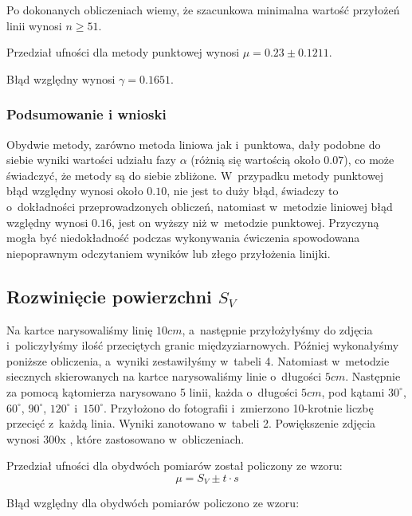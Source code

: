 \documentclass[a4paper,12pt]{article}
\begin{document}
Po dokonanych obliczeniach wiemy, że szacunkowa minimalna wartość przyłożeń linii wynosi $n\ge 51$.



Przedział ufności dla metody punktowej wynosi $\mu=0.23\pm 0.1211$.

Błąd względny wynosi $\gamma=0.1651$.
\newpage

{\color{purple}
\subsubsection{Podsumowanie i wnioski}



Obydwie metody, zarówno metoda liniowa jak i~punktowa, dały podobne  do siebie wyniki wartości udziału fazy $\alpha$ (różnią się wartością około $0.07$), co może świadczyć, że metody są do siebie zbliżone. W~przypadku metody punktowej błąd względny wynosi  około $0.10$, nie jest to duży błąd, świadczy to  o~dokładności przeprowadzonych obliczeń, natomiast w~metodzie liniowej błąd względny wynosi  $0.16$, jest on wyższy niż w~metodzie punktowej. Przyczyną mogła być niedokładność  podczas wykonywania  ćwiczenia spowodowana niepoprawnym odczytaniem wyników lub złego przyłożenia linijki.}
\newpage

\subsection{Rozwinięcie powierzchni $S_V$}

Na kartce narysowaliśmy linię $10cm$, a~następnie przyłożyłyśmy do zdjęcia i~policzyłyśmy ilość przeciętych granic międzyziarnowych. Później wykonałyśmy poniższe obliczenia, a~wyniki zestawiłyśmy w~tabeli 4.  Natomiast w~metodzie siecznych skierowanych na kartce narysowaliśmy linie o~długości $5cm$. Następnie za pomocą kątomierza narysowano 5 linii, każda o~długości $5cm$, pod kątami $30^\circ$, $60^\circ$, $90^\circ$, $120^\circ$ i~$150^\circ$. Przyłożono do fotografii i~zmierzono 10-krotnie liczbę przecięć z~każdą linia. Wyniki zanotowano w~tabeli 2.
Powiększenie zdjęcia  wynosi 300x , które zastosowano w~obliczeniach.
\newline

Przedział ufności dla obydwóch pomiarów został policzony ze wzoru:
$$\mu = S_V\pm t\cdot s$$
\newline 

Błąd względny dla obydwóch pomiarów policzono ze wzoru:
\end{document}
